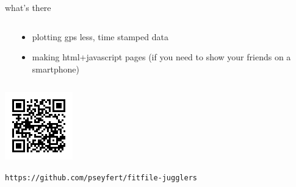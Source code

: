 \documentclass[table,xcolor=dvipsnames,professionalfonts]{beamer}
\begin{document}
\begin{frame}
\begin{exampleblock}{what's there}
{\begin{columns}
\begin{column}{.48\textwidth}
        \end{column}
        \begin{column}{.48\textwidth}
          \begin{itemize}
              \item plotting gps less, time stamped data
                \item<3> making html+javascript pages
                  \newline (if you need to show your friends on a smartphone)
          \end{itemize}
        \end{column}
        \end{columns}
    }
  \end{exampleblock}
\end{frame}

\begin{frame}
  \includegraphics[width=.35\textwidth]{./QR.png}

  \texttt{https://github.com/pseyfert/fitfile-jugglers}
\end{frame}
\end{document}
